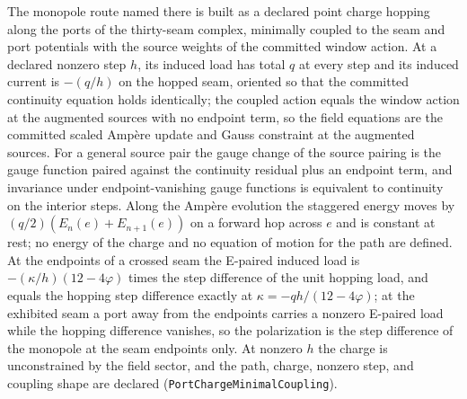 \documentclass[11pt]{article}
\begin{document}
The monopole route named there is built as a declared point charge
hopping along the ports of the thirty-seam complex, minimally coupled to
the seam and port potentials with the source weights of the committed
window action. At a declared nonzero step \(h\), its induced load has total
\(q\) at every step and its induced current is \(-(q/h)\) on the hopped seam, oriented so that the
committed continuity equation holds identically; the coupled action equals
the window action at the augmented sources with no endpoint term, so the
field equations are the committed scaled Amp\`ere update and Gauss
constraint at the augmented sources. For a general source pair the gauge
change of the source pairing is the gauge function paired against the
continuity residual plus an endpoint term, and invariance under
endpoint-vanishing gauge functions is equivalent to continuity on the
interior steps. Along the Amp\`ere evolution the staggered energy moves by
\((q/2)(E_n(e)+E_{n+1}(e))\) on a forward hop across \(e\) and is constant
at rest; no energy of the charge and no equation of motion for the path
are defined. At the endpoints of a crossed seam the E-paired induced load
is \(-(\kappa/h)(12-4\varphi)\) times the step difference of the unit
hopping load, and equals the hopping step difference exactly at
\(\kappa=-qh/(12-4\varphi)\); at the exhibited seam a port away from the
endpoints carries a nonzero E-paired load while the hopping difference
vanishes, so the polarization is the step difference of the monopole at
the seam endpoints only. At nonzero \(h\) the charge is unconstrained by the field sector,
and the path, charge, nonzero step, and coupling shape are declared
(\texttt{PortChargeMinimalCoupling}).
\end{document}
